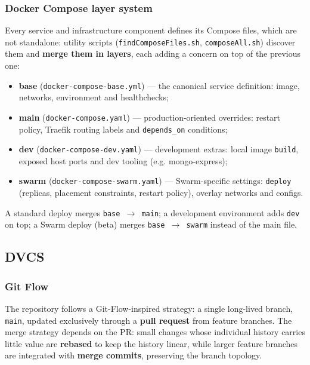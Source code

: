 \subsubsection{Docker Compose layer system}

Every service and infrastructure component defines its Compose files, which are not standalone: utility scripts (\texttt{findComposeFiles.sh}, \texttt{composeAll.sh}) discover them and \textbf{merge them in layers}, each adding a concern on top of the previous one:

\begin{itemize}
  \item \textbf{base} (\texttt{docker-compose-base.yml}) --- the canonical service definition: image, networks, environment and healthchecks;
  \item \textbf{main} (\texttt{docker-compose.yaml}) --- production-oriented overrides: restart policy, Traefik routing labels and \texttt{depends\_on} conditions;
  \item \textbf{dev} (\texttt{docker-compose-dev.yaml}) --- development extras: local image \texttt{build}, exposed host ports and dev tooling (e.g. mongo-express);
  \item \textbf{swarm} (\texttt{docker-compose-swarm.yaml}) --- Swarm-specific settings: \texttt{deploy} (replicas, placement constraints, restart policy), overlay networks and configs.
\end{itemize}

A standard deploy merges \texttt{base $\rightarrow$ main}; a development environment adds \texttt{dev} on top; a Swarm deploy (beta) merges \texttt{base $\rightarrow$ swarm} instead of the main file.

\subsection{DVCS}

\subsubsection{Git Flow}

The repository follows a Git-Flow-inspired strategy: a single long-lived branch, \texttt{main}, updated exclusively through a \textbf{pull request} from feature branches. The merge strategy depends on the PR: small changes whose individual history carries little value are \textbf{rebased} to keep the history linear, while larger feature branches are integrated with \textbf{merge commits}, preserving the branch topology.

